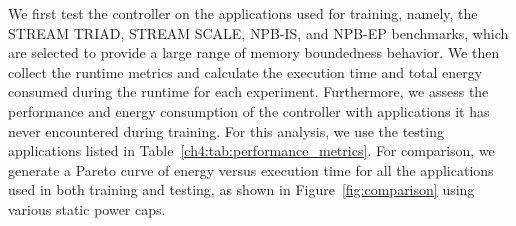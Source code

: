 We first test the controller on the applications used for training, namely, the STREAM TRIAD, STREAM SCALE, NPB-IS, and NPB-EP benchmarks, which are selected to provide a large range of memory boundedness behavior. We then collect the runtime metrics and calculate the execution time and total energy consumed during the runtime for each experiment. Furthermore, we assess the performance and energy consumption of the controller with applications it has never encountered during training. For this analysis, we use the testing applications listed in Table~\ref{ch4:tab:performance_metrics}.
For comparison, we generate a Pareto curve of energy versus execution time for all the applications used in both training and testing, as shown in Figure~\ref{fig:comparison} using various static power caps. 

